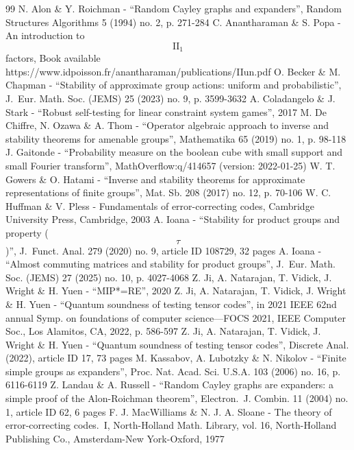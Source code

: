 \documentclass[10pt]{amsart}
\theoremstyle{plain}
\theoremstyle{definition}
\begin{document}
\begin{thebibliography}{99}
 N. Alon \& Y. Roichman - “Random Cayley graphs and expanders”, Random Structures Algorithms 5 (1994) no. 2, p. 271-284
 C. Anantharaman \& S. Popa - An introduction to $$\mathrm{II}_1$$ factors, Book available https://www.idpoisson.fr/anantharaman/publications/IIun.pdf
 O. Becker \& M. Chapman - “Stability of approximate group actions: uniform and probabilistic”, J. Eur. Math. Soc. (JEMS) 25 (2023) no. 9, p. 3599-3632
 A. Coladangelo \& J. Stark - “Robust self-testing for linear constraint system games”, 2017
 M. De Chiffre, N. Ozawa \& A. Thom - “Operator algebraic approach to inverse and stability theorems for amenable groups”, Mathematika 65 (2019) no. 1, p. 98-118
 J. Gaitonde - “Probability measure on the boolean cube with small support and small Fourier transform”, MathOverflow:q/414657 (version: 2022-01-25)
 W. T. Gowers \& O. Hatami - “Inverse and stability theorems for approximate representations of finite groups”, Mat. Sb. 208 (2017) no. 12, p. 70-106
 W. C. Huffman \& V. Pless - Fundamentals of error-correcting codes, Cambridge University Press, Cambridge, 2003
 A. Ioana - “Stability for product groups and property ($$\tau $$)”, J. Funct. Anal. 279 (2020) no. 9, article ID 108729, 32 pages
 A. Ioana - “Almost commuting matrices and stability for product groups”, J. Eur. Math. Soc. (JEMS) 27 (2025) no. 10, p. 4027-4068
 Z. Ji, A. Natarajan, T. Vidick, J. Wright \& H. Yuen - “MIP*=RE”, 2020
 Z. Ji, A. Natarajan, T. Vidick, J. Wright \& H. Yuen - “Quantum soundness of testing tensor codes”, in 2021 IEEE 62nd annual Symp. on foundations of computer science—FOCS 2021, IEEE Computer Soc., Los Alamitos, CA, 2022, p. 586-597
 Z. Ji, A. Natarajan, T. Vidick, J. Wright \& H. Yuen - “Quantum soundness of testing tensor codes”, Discrete Anal. (2022), article ID 17, 73 pages
 M. Kassabov, A. Lubotzky \& N. Nikolov - “Finite simple groups as expanders”, Proc. Nat. Acad. Sci. U.S.A. 103 (2006) no. 16, p. 6116-6119
 Z. Landau \& A. Russell - “Random Cayley graphs are expanders: a simple proof of the Alon-Roichman theorem”, Electron. J. Combin. 11 (2004) no. 1, article ID 62, 6 pages
 F. J. MacWilliams \& N. J. A. Sloane - The theory of error-correcting codes. I, North-Holland Math. Library, vol. 16, North-Holland Publishing Co., Amsterdam-New York-Oxford, 1977

\end{thebibliography}
\end{document}
